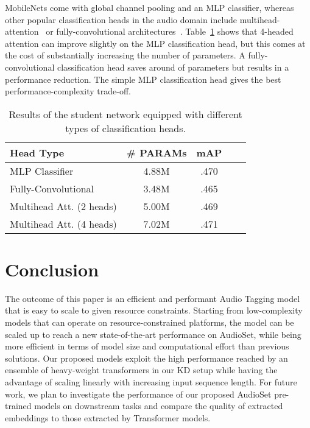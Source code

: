 \documentclass{article}
\begin{document}
MobileNets come with global channel pooling and an MLP classifier, whereas other popular classification heads in the audio domain include multihead-attention~\cite{Gong21PSLA} or fully-convolutional architectures~\cite{Koutini21Receptive}. Table~\ref{tab:heads} shows that 4-headed attention can improve slightly on the MLP classification head, but this comes at the cost of substantially increasing the number of parameters. A fully-convolutional classification head saves around  of parameters but results in a performance reduction. The simple MLP classification head gives the best performance-complexity trade-off.



\begin{table}[h]
\begin{center}
\begin{small}
\begin{tabular}{l|cccc}
\textbf{Head Type} & \textbf{\# PARAMs} & \textbf{mAP} \\ 
\midrule
\cellcolor{lightgray}MLP Classifier & 4.88M  & .470 \\
Fully-Convolutional & 3.48M & .465 \\
Multihead Att. (2 heads) & 5.00M  & .469 \\
Multihead Att. (4 heads) & 7.02M  & .471 \\
\bottomrule
\end{tabular}
\caption{Results of the student network equipped with different types of classification heads.}
\label{tab:heads}
\end{small}
\end{center}
\vspace{-14pt}
\end{table}




\vspace{-6pt}
\section{Conclusion}
\label{sec:conclusion}
The outcome of this paper is an efficient and performant Audio Tagging model that is easy to scale to given resource constraints. Starting from low-complexity models that can operate on resource-constrained platforms, the model can be scaled up to reach a new state-of-the-art performance on AudioSet, while being more efficient in terms of model size and computational effort than previous solutions. Our proposed models exploit the high performance reached by an ensemble of heavy-weight transformers in our KD setup while having the advantage of scaling linearly with increasing input sequence length. For future work, we plan to investigate the performance of our proposed AudioSet pre-trained models on downstream tasks and compare the quality of extracted embeddings to those extracted by Transformer models.
\end{document}
